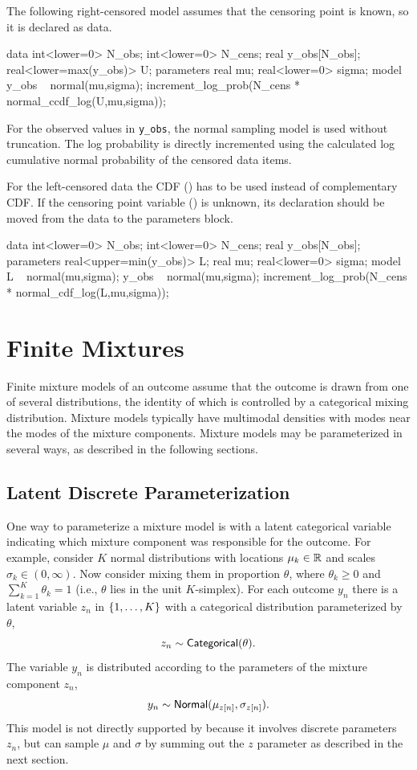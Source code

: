 The following right-censored model assumes
that the censoring point is known, so it is declared as data.
%
\begin{stancode}
data {
  int<lower=0> N_obs;
  int<lower=0> N_cens;
  real y_obs[N_obs];
  real<lower=max(y_obs)> U;
}
parameters {
  real mu;
  real<lower=0> sigma;
}
model {
  y_obs ~ normal(mu,sigma); 
  increment_log_prob(N_cens * normal_ccdf_log(U,mu,sigma));
}
\end{stancode}
%
For the observed values in \Verb|y_obs|, the normal sampling model is
used without truncation.  The log probability is directly incremented
using the calculated log cumulative normal probability of the censored
data items.

For the left-censored data the CDF
() has to be used instead of complementary CDF.
If the censoring point variable () is unknown,
its declaration should be moved from the data to the parameters block. 
%
\begin{stancode}
data {
  int<lower=0> N_obs;
  int<lower=0> N_cens;
  real y_obs[N_obs];
}
parameters {
  real<upper=min(y_obs)> L;
  real mu;
  real<lower=0> sigma;
}
model {
  L ~ normal(mu,sigma);
  y_obs ~ normal(mu,sigma);
  increment_log_prob(N_cens * normal_cdf_log(L,mu,sigma));
}
\end{stancode}
%

\chapter{Finite Mixtures}\label{mixture-modeling.chapter}

\noindent
Finite mixture models of an outcome assume that the outcome is drawn
from one of several distributions, the identity of which is controlled
by a categorical mixing distribution. Mixture models typically have
multimodal densities with modes near the modes of the mixture
components.  Mixture models may be parameterized in several ways, as
described in the following sections.


\section{Latent Discrete Parameterization}

One way to parameterize a mixture model is with a latent categorical
variable indicating which mixture component was responsible for the
outcome. For example, consider $K$ normal distributions with locations
$\mu_k \in \reals$ and scales $\sigma_k \in (0,\infty)$.  Now consider
mixing them in proportion $\theta$, where $\theta_k \geq 0$ and
$\sum_{k=1}^K \theta_k = 1$ (i.e., $\theta$ lies in the unit $K$-simplex).
For each outcome $y_n$ there is a latent variable $z_n$ in
$\setlist{1,\ldots,K}$ with a categorical distribution parameterized
by $\theta$,
%
\[
z_n \sim \distro{Categorical}(\theta).
\]
%
The variable $y_n$ is distributed according to the parameters
of the mixture component $z_n$, 
\[
y_n \sim \distro{Normal}(\mu_{z[n]},\sigma_{z[n]}).
\]
%
This model is not directly supported by \Stan because it involves
discrete parameters $z_n$, but \Stan can sample $\mu$ and $\sigma$ 
by summing out the $z$ parameter as described in the next section.


